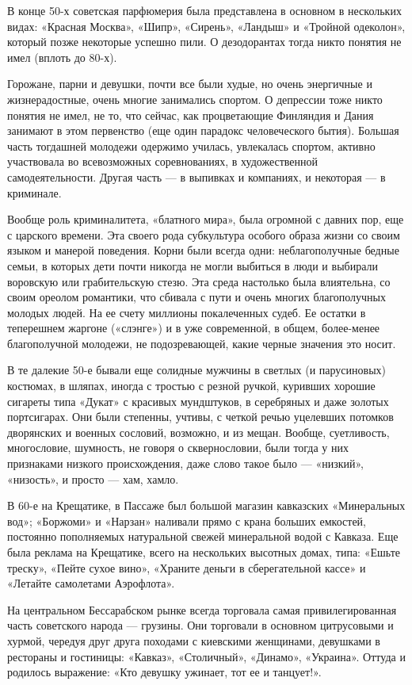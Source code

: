 В конце 50-х советская парфюмерия была представлена в основном в нескольких
видах: «Красная Москва», «Шипр», «Сирень», «Ландыш» и «Тройной одеколон»,
который позже некоторые успешно пили. О дезодорантах тогда никто понятия не
имел (вплоть до 80-х). 

Горожане, парни и девушки, почти все были худые, но очень энергичные и
жизнерадостные, очень многие занимались спортом. О депрессии тоже никто понятия
не имел, не то, что сейчас, как процветающие Финляндия и Дания занимают в этом
первенство (еще один парадокс человеческого бытия). Большая часть тогдашней
молодежи одержимо училась, увлекалась спортом, активно участвовала во
всевозможных соревнованиях, в художественной самодеятельности. Другая часть --- в
выпивках и компаниях, и некоторая --- в криминале.

Вообще роль криминалитета, «блатного мира», была огромной с давних пор, еще с
царского времени. Эта своего рода субкультура особого образа жизни со своим
языком и манерой поведения. Корни были всегда одни: неблагополучные бедные
семьи, в которых дети почти никогда не могли выбиться в люди и выбирали
воровскую или грабительскую стезю. Эта среда настолько была влиятельна, со
своим ореолом романтики, что сбивала с пути и очень многих благополучных
молодых людей. На ее счету миллионы покалеченных судеб. Ее остатки в теперешнем
жаргоне («слэнге») и в уже современной, в общем, более-менее благополучной
молодежи, не подозревающей, какие черные значения это носит. 

В те далекие 50-е бывали еще солидные мужчины в светлых (и парусиновых)
костюмах, в шляпах, иногда с тростью с резной ручкой, куривших хорошие сигареты
типа «Дукат» с красивых мундштуков, в серебряных и даже золотых портсигарах.
Они были степенны, учтивы, с четкой речью уцелевших потомков дворянских и
военных сословий, возможно, и из мещан. Вообще, суетливость, многословие,
шумность, не говоря о сквернословии, были тогда у них признаками низкого
происхождения, даже слово такое было --- «низкий», «низость», и просто --- хам,
хамло.

В 60-е на Крещатике, в Пассаже был большой магазин кавказских «Минеральных
вод»; «Боржоми» и «Нарзан» наливали прямо с крана больших емкостей, постоянно
пополняемых натуральной свежей минеральной водой с Кавказа. Еще была реклама на
Крещатике, всего на нескольких высотных домах, типа: «Ешьте треску», «Пейте
сухое вино», «Храните деньги в сберегательной кассе» и «Летайте самолетами
Аэрофлота».

На центральном Бессарабском рынке всегда торговала самая привилегированная
часть советского народа --- грузины. Они торговали в основном цитрусовыми и
хурмой, чередуя друг друга походами с киевскими женщинами, девушками в
рестораны и гостиницы: «Кавказ», «Столичный», «Динамо», «Украина». Оттуда и
родилось выражение: «Кто девушку ужинает, тот ее и танцует!».

